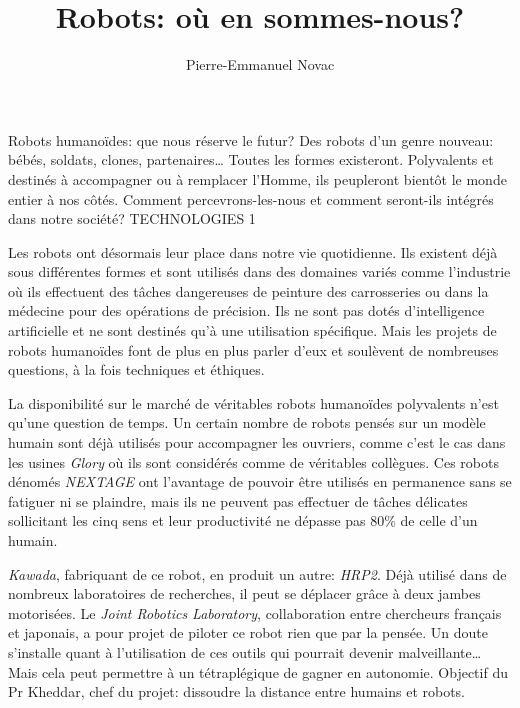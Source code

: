 \documentclass[9pt,final,hyphenatedtitles]{papertex}
\title{Robots: où en sommes-nous?}
\author{Pierre-Emmanuel Novac}
\begin{document}
\begin{news}{3}
	{Robots humanoïdes: que nous réserve le futur?}
	{Des robots d'un genre nouveau: bébés, soldats, clones, partenaires… Toutes les formes existeront. Polyvalents et destinés à accompagner ou à remplacer l'Homme, ils peupleront bientôt le monde entier à nos côtés. Comment percevrons-les-nous et comment seront-ils intégrés dans notre société?}
	{TECHNOLOGIES}
	{1}
	
	
	
\vspace*{2.5mm}
 Les robots ont désormais leur place dans notre vie quotidienne. Ils existent déjà sous différentes formes et sont utilisés dans des domaines variés comme l'industrie où ils effectuent des tâches dangereuses de peinture des carrosseries ou dans la médecine pour des opérations de précision. Ils ne sont pas dotés d'intelligence artificielle et ne sont destinés qu'à une utilisation spécifique. Mais les projets de robots humanoïdes font de plus en plus parler d'eux et soulèvent de nombreuses questions, à la fois techniques et éthiques.


La disponibilité sur le marché de véritables robots humanoïdes polyvalents n'est qu'une question de temps. Un certain nombre de robots pensés sur un modèle humain sont déjà utilisés pour accompagner les ouvriers, comme c'est le cas dans les usines \textit{Glory} où ils sont considérés comme de véritables collègues. Ces robots dénomés \textit{NEXTAGE} ont l'avantage de pouvoir être utilisés en permanence sans se fatiguer ni se plaindre, mais ils ne peuvent pas effectuer de tâches délicates sollicitant les cinq sens et leur productivité ne dépasse pas 80\% de celle d'un humain.




\textit{Kawada}, fabriquant de ce robot, en produit un autre: \textit{HRP2}. Déjà utilisé dans de nombreux laboratoires de recherches, il peut se déplacer grâce à deux jambes motorisées. Le \textit{Joint Robotics Laboratory}, collaboration entre chercheurs français et japonais, a pour projet de piloter ce robot rien que par la pensée. Un doute s'installe quant à l'utilisation de ces outils qui pourrait devenir malveillante… Mais cela peut permettre à un tétraplégique de gagner en autonomie. Objectif du Pr Kheddar, chef du projet: dissoudre la distance entre humains et robots.



\end{news}
\end{document}
